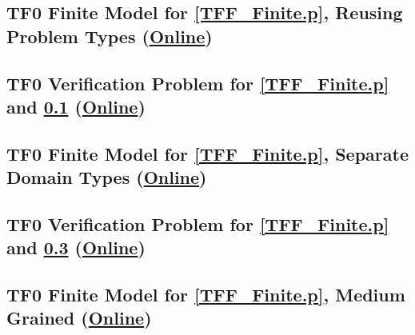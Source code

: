 \documentclass{easychair}
\begin{document}
\newpage
\subsection{TF0 Finite Model for \ref{TFF_Finite.p}, Reusing Problem Types
(\href{https://raw.githubusercontent.com/GeoffsPapers/InterpretationFormat/master/Examples/TFF_Finite.s}{Online})}
\label{TFF_Finite.s}
\begin{small}

\end{small}

\newpage
\subsection{TF0 Verification Problem for \ref{TFF_Finite.p} and \ref{TFF_Finite.s}
(\href{https://raw.githubusercontent.com/GeoffsPapers/InterpretationFormat/master/Examples/TFF_Finite.s.p}{Online})}
\label{TFF_Finite.s.p}
\begin{small}

\end{small}

\newpage
\subsection{TF0 Finite Model for \ref{TFF_Finite.p}, Separate Domain Types
(\href{https://raw.githubusercontent.com/GeoffsPapers/InterpretationFormat/master/Examples/TFF_Finite_SeparateDomains.s}{Online})}
\label{TFF_Finite_SeparateDomains.s}
\begin{small}

\end{small}

\newpage
\subsection{TF0 Verification Problem for \ref{TFF_Finite.p} and \ref{TFF_Finite_SeparateDomains.s}
(\href{https://raw.githubusercontent.com/GeoffsPapers/InterpretationFormat/master/Examples/TFF_Finite_SeparateDomains.s.p}{Online})}
\label{TFF_Finite_SeparateDomains.s.p}
\begin{small}

\end{small}

\newpage
\subsection{TF0 Finite Model for \ref{TFF_Finite.p}, Medium Grained
(\href{https://raw.githubusercontent.com/GeoffsPapers/InterpretationFormat/master/Examples/TFF_Finite_Medium.s}{Online})}
\label{TFF_Finite_Medium.s}
\begin{small}

\end{small}
\end{document}

